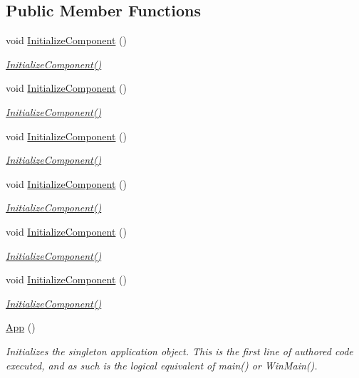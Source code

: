 \subsection*{Public Member Functions}
\begin{DoxyCompactItemize}
\item 
void \hyperlink{class_tests_1_1_app_a875bfeeb11fe6c3334e474fd5fc1ea20}{Initialize\+Component} ()
\begin{DoxyCompactList}\small\item\em \hyperlink{class_tests_1_1_app_a875bfeeb11fe6c3334e474fd5fc1ea20}{Initialize\+Component()} \end{DoxyCompactList}\item 
void \hyperlink{class_tests_1_1_app_a875bfeeb11fe6c3334e474fd5fc1ea20}{Initialize\+Component} ()
\begin{DoxyCompactList}\small\item\em \hyperlink{class_tests_1_1_app_a875bfeeb11fe6c3334e474fd5fc1ea20}{Initialize\+Component()} \end{DoxyCompactList}\item 
void \hyperlink{class_tests_1_1_app_a875bfeeb11fe6c3334e474fd5fc1ea20}{Initialize\+Component} ()
\begin{DoxyCompactList}\small\item\em \hyperlink{class_tests_1_1_app_a875bfeeb11fe6c3334e474fd5fc1ea20}{Initialize\+Component()} \end{DoxyCompactList}\item 
void \hyperlink{class_tests_1_1_app_a875bfeeb11fe6c3334e474fd5fc1ea20}{Initialize\+Component} ()
\begin{DoxyCompactList}\small\item\em \hyperlink{class_tests_1_1_app_a875bfeeb11fe6c3334e474fd5fc1ea20}{Initialize\+Component()} \end{DoxyCompactList}\item 
void \hyperlink{class_tests_1_1_app_a875bfeeb11fe6c3334e474fd5fc1ea20}{Initialize\+Component} ()
\begin{DoxyCompactList}\small\item\em \hyperlink{class_tests_1_1_app_a875bfeeb11fe6c3334e474fd5fc1ea20}{Initialize\+Component()} \end{DoxyCompactList}\item 
void \hyperlink{class_tests_1_1_app_a875bfeeb11fe6c3334e474fd5fc1ea20}{Initialize\+Component} ()
\begin{DoxyCompactList}\small\item\em \hyperlink{class_tests_1_1_app_a875bfeeb11fe6c3334e474fd5fc1ea20}{Initialize\+Component()} \end{DoxyCompactList}\item 
\hyperlink{class_tests_1_1_app_a93de4601ce9c974faf8a675562f5caba}{App} ()
\begin{DoxyCompactList}\small\item\em Initializes the singleton application object. This is the first line of authored code executed, and as such is the logical equivalent of main() or Win\+Main(). \end{DoxyCompactList}\end{DoxyCompactItemize}
